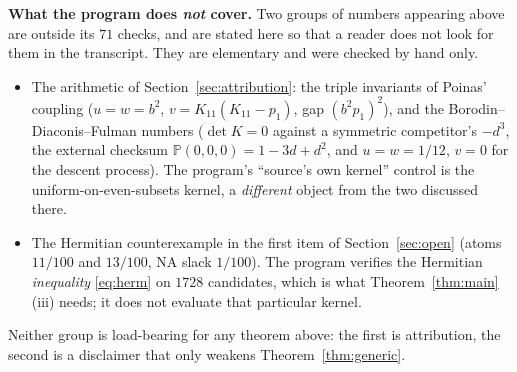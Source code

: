 \documentclass[11pt]{amsart}
\theoremstyle{remark}
\begin{document}
\medskip
\noindent\textbf{What the program does \emph{not} cover.} Two groups of numbers appearing
above are outside its $71$ checks, and are stated here so that a reader does not look for
them in the transcript. They are elementary and were checked by hand only.
\begin{itemize}
\item The arithmetic of Section~\ref{sec:attribution}: the triple invariants of Poinas'
coupling ($u=w=b^{2}$, $v=K_{11}(K_{11}-p_{1})$, gap $(b^{2}p_{1})^{2}$), and the
Borodin--Diaconis--Fulman numbers ($\det K=0$ against a symmetric competitor's $-d^{3}$, the
external checksum $\mathbb P(0,0,0)=1-3d+d^{2}$, and $u=w=1/12$, $v=0$ for the descent
process). The program's ``source's own kernel'' control is the uniform-on-even-subsets
kernel, a \emph{different} object from the two discussed there.
\item The Hermitian counterexample in the first item of Section~\ref{sec:open} (atoms
$11/100$ and $13/100$, NA slack $1/100$). The program verifies the Hermitian
\emph{inequality} \eqref{eq:herm} on $1728$ candidates, which is what
Theorem~\ref{thm:main}(iii) needs; it does not evaluate that particular kernel.
\end{itemize}
\noindent
Neither group is load-bearing for any theorem above: the first is attribution, the second is
a disclaimer that only weakens Theorem~\ref{thm:generic}.
\end{document}
